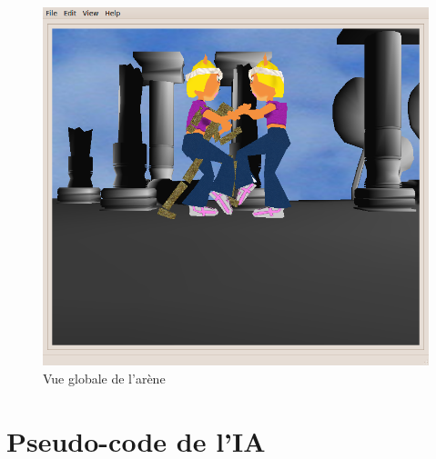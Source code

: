 \begin{figure}[!h]
	\center
	\includegraphics[scale=0.4]{visuel/capture-rev140-1.png}
	\caption{Vue globale de l'arène}
\end{figure}

\newpage
\section{Pseudo-code de l'IA}

